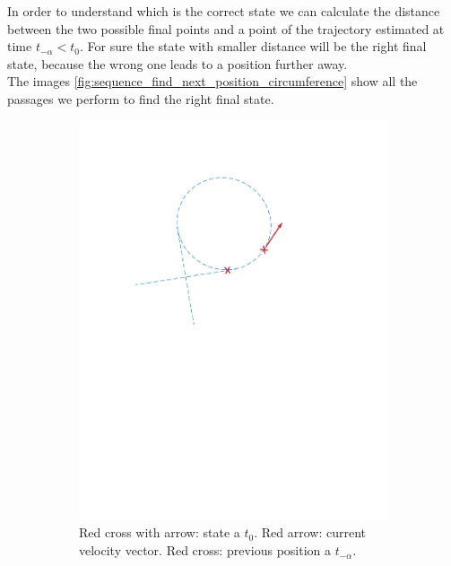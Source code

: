 \begin{itemize}
In order to understand which is the correct state we can calculate the distance between the two possible final points and a point of the trajectory estimated at time $ t_{-\alpha} < t_0$. For sure the state with smaller distance will be the right final state, because the wrong one leads to a position further away.\\
The images  \ref{fig:sequence_find_next_position_circumference} show all the passages we perform to find the right final state.

\begin{figure}[!htbp]
  \centering
   \begin{subfigure}[b]{0.45\textwidth}
        \includegraphics[width=\textwidth]{img/circular_movment1.pdf}
        \caption{Red cross with arrow: state a $t_0$. Red arrow: current velocity vector. Red cross: previous position a $t_{-\alpha}$.}
        \label{fig:one}
   \end{subfigure}\hfill
   \begin{subfigure}[b]{0.45\textwidth}

\end{subfigure}
\end{figure}
\end{itemize}
